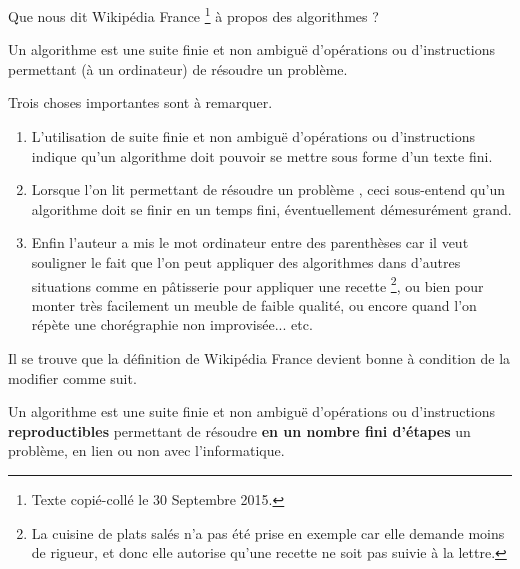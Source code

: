 Que nous dit Wikipédia France
\footnote{
	Texte copié-collé le 30 Septembre 2015.
}
à propos des algorithmes ?

\vspace{-0.3em}

\begin{Quote}[author = Wikipédia]
	Un algorithme est une suite finie et non ambiguë d’opérations ou d'instructions permettant (à un ordinateur) de résoudre un problème.
\end{Quote}

\vspace{-0.3em}

Trois choses importantes sont à remarquer.
\begin{enumerate}
	\item L'utilisation de \og suite finie et non ambiguë d’opérations ou d'instructions \fg{} indique qu'un algorithme doit pouvoir se mettre sous forme d'un texte fini. 

	\item Lorsque l'on lit \og permettant de résoudre un problème \fg{}, ceci sous-entend qu'un algorithme doit se finir en un temps fini, éventuellement démesurément grand. 

	\item Enfin l'auteur a mis le mot \og ordinateur \fg entre des parenthèses car il veut souligner le fait que l'on peut appliquer des algorithmes dans d'autres situations comme en pâtisserie pour appliquer une recette
\footnote{
	La cuisine de plats salés n'a pas été prise en exemple car elle demande moins de rigueur, et donc elle autorise qu'une recette ne soit pas suivie à la lettre.
},
ou bien pour monter très facilement un meuble de faible qualité, ou encore quand l'on répète une chorégraphie non improvisée... etc. 
\end{enumerate}

\medskip

Il se trouve que la définition de Wikipédia France devient bonne à condition de la modifier comme suit. 

\vspace{-0.3em}

\begin{Quote}
	Un algorithme est une suite finie et non ambiguë d’opérations ou d'instructions \textbf{reproductibles} permettant de résoudre \textbf{en un nombre fini d'étapes} un problème, en lien ou non avec l'informatique.
\end{Quote}

\vspace{-0.3em}

